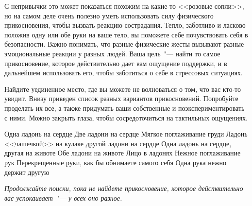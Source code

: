 \newpage
{}\label{IP:Soothing_Touch}

С непривычки это может показаться похожим на какие-то <<розовые сопли>>, но на самом деле очень полезно уметь использовать силу физического прикосновения, чтобы вызвать реакцию сострадания. Тепло, заботливо и ласково положив одну или обе руки на ваше тело, вы поможете себе почувствовать себя в безопасности. Важно понимать, что разные физические жесты вызывают разные эмоциональные реакции у разных людей. Ваша цель~"--- найти то самое прикосновение, которое действительно дает вам ощущение поддержки, и в дальнейшем использовать его, чтобы заботиться о себе в стрессовых ситуациях. 

Найдите уединенное место, где вы можете не волноваться о том, что вас кто-то увидит. Внизу приведен список разных вариантов прикосновений. Попробуйте проделать их все, а также придумать ваши собственные и поэкспериментировать с ними. Можно закрыть глаза, чтобы сосредоточиться на тактильных ощущениях. 

\begin{itemize}
	\itemheart Одна ладонь на сердце
	\itemheart Две ладони на сердце
	\itemheart Мягкое поглаживание груди
	\itemheart Ладонь <<чашечкой>> на кулаке другой ладони на сердце
	\itemheart Одна ладонь на сердце, другая на животе
	\itemheart Обе ладони на животе 
	\itemheart Лицо в ладонях
	\itemheart Нежное поглаживание рук
	\itemheart Перекрещенные руки, как бы обнимаете самого себя 
	\itemheart Одна рука нежно держит другую
\end{itemize}

\vspace{2ex}

\textit{Продолжайте поиски, пока не найдете прикосновение, которое действительно вас успокаивает~"--- у всех оно разное.}

\newpage
{}

